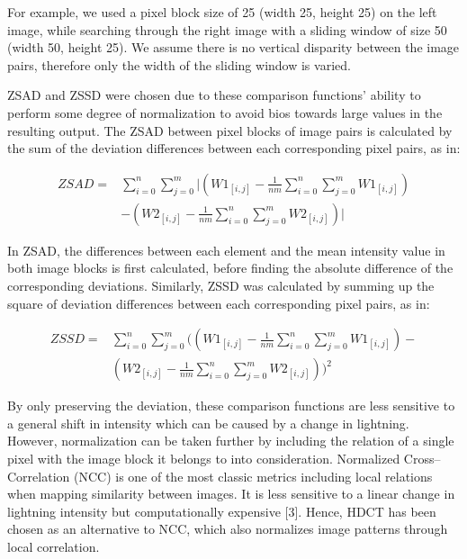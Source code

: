 \documentclass[conference]{IEEEtran}
\begin{document}
For example, we used a pixel block size of 25 (width 25, height 25) on the left image, while searching through the right image with a sliding window of size 50 (width 50, height 25). We assume there is no vertical disparity between the image pairs, therefore only the width of the sliding window is varied.

ZSAD and ZSSD were chosen due to these comparison functions' ability to perform some degree of normalization to avoid bios towards large values in the resulting output. The ZSAD between pixel blocks of image pairs is calculated by the sum of the deviation differences between each corresponding pixel pairs, as in:

\begin{equation*}
    \begin{aligned}
        ZSAD= {} & \sum^{n}_{i=0}\sum^{m}_{j=0}|(W1_{[i,j]}-\frac{1}{nm}\sum^{n}_{i=0}\sum^{m}_{j=0}W1_{[i,j]})\\
        & -(W2_{[i,j]}-\frac{1}{nm}\sum^{n}_{i=0}\sum^{m}_{j=0}W2_{[i,j]})|
    \end{aligned}
\end{equation*}

In ZSAD, the differences between each element and the mean intensity value in both image blocks is first calculated, before finding the absolute difference of the corresponding deviations. Similarly, ZSSD was calculated by summing up the square of deviation differences between each corresponding pixel pairs, as in:

\begin{equation*}
    \begin{aligned}
        ZSSD= {} & \sum^{n}_{i=0}\sum^{m}_{j=0}((W1_{[i,j]}-\frac{1}{nm}\sum^{n}_{i=0}\sum^{m}_{j=0}W1_{[i,j]})- \\
        & (W2_{[i,j]}-\frac{1}{nm}\sum^{n}_{i=0}\sum^{m}_{j=0}W2_{[i,j]}))^2
    \end{aligned}
\end{equation*}

By only preserving the deviation, these comparison functions are less sensitive to a general shift in intensity which can be caused by a change in lightning. However, normalization can be taken further by including the relation of a single pixel with the image block it belongs to into consideration. Normalized Cross--Correlation (NCC) is one of the most classic metrics including local relations when mapping similarity between images. It is less sensitive to a linear change in lightning intensity but computationally expensive [3]. Hence, HDCT has been chosen as an alternative to NCC, which also normalizes image patterns through local correlation. 
\end{document}
